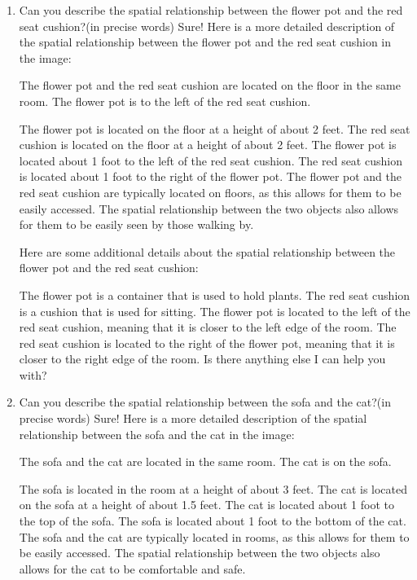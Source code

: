 \begin{enumerate}
    \item Can you describe the spatial relationship between the flower pot and the red seat cushion?(in precise words)
    \subitem Sure! Here is a more detailed description of the spatial relationship between the flower pot and the red seat cushion in the image:

    The flower pot and the red seat cushion are located on the floor in the same room. The flower pot is to the left of the red seat cushion.
    
    The flower pot is located on the floor at a height of about 2 feet.
    The red seat cushion is located on the floor at a height of about 2 feet.
    The flower pot is located about 1 foot to the left of the red seat cushion.
    The red seat cushion is located about 1 foot to the right of the flower pot.
    The flower pot and the red seat cushion are typically located on floors, as this allows for them to be easily accessed. The spatial relationship between the two objects also allows for them to be easily seen by those walking by.
    
    Here are some additional details about the spatial relationship between the flower pot and the red seat cushion:
    
    The flower pot is a container that is used to hold plants.
    The red seat cushion is a cushion that is used for sitting.
    The flower pot is located to the left of the red seat cushion, meaning that it is closer to the left edge of the room.
    The red seat cushion is located to the right of the flower pot, meaning that it is closer to the right edge of the room.
    Is there anything else I can help you with?
    \item Can you describe the spatial relationship between the sofa and the cat?(in precise words)
    \subitem Sure! Here is a more detailed description of the spatial relationship between the sofa and the cat in the image:

    The sofa and the cat are located in the same room. The cat is on the sofa.
    
    The sofa is located in the room at a height of about 3 feet.
    The cat is located on the sofa at a height of about 1.5 feet.
    The cat is located about 1 foot to the top of the sofa.
    The sofa is located about 1 foot to the bottom of the cat.
    The sofa and the cat are typically located in rooms, as this allows for them to be easily accessed. The spatial relationship between the two objects also allows for the cat to be comfortable and safe.
    

\end{enumerate}
